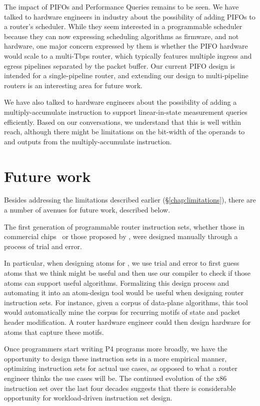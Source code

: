 The impact of PIFOs and Performance Queries remains to be seen. We have talked
to hardware engineers in industry about the possibility of adding PIFOs to a
router's scheduler. While they seem interested in a programmable scheduler
because they can now expressing scheduling algorithms as firmware, and not
hardware, one major concern expressed by them is whether the PIFO hardware
would scale to a multi-Tbps router, which typically features multiple ingress
and egress pipelines separated by the packet buffer. Our current PIFO design is
intended for a single-pipeline router, and extending our design to
multi-pipeline routers is an interesting area for future work.

We have also talked to hardware engineers about the possibility of adding a
multiply-accumulate instruction to support linear-in-state measurement queries
efficiently. Based on our conversations, we understand that this is well within
reach, although there might be limitations on the bit-width of the operands to and
outputs from the multiply-accumulate instruction.

\section{Future work}
\label{s:future}

Besides addressing the limitations described earlier (\S\ref{chap:limitations}),
there are a number of avenues for future work, described below.

 The first generation of programmable
router instruction sets, whether those in commercial chips~\cite{xpliant,
flexpipe, tofino, rmt} or those proposed by \pktlanguage, were designed
manually through a process of trial and error.

In particular, when designing atoms for \pktlanguage, we use trial and error to
first guess atoms that we think might be useful and then use our compiler to
check if those atoms can support useful algorithms.  Formalizing this design
process and automating it into an atom-design tool would be useful when
designing router instruction sets. For instance, given a corpus of data-plane
algorithms, this tool would automatically mine the corpus for recurring motifs
of state and packet header modification. A router hardware engineer could then
design hardware for atoms that capture these motifs.

 Once programmers start writing P4 programs more broadly, we have the
opportunity to design these instruction sets in a more empirical manner,
optimizing instruction sets for actual use cases, as opposed to what a router
engineer thinks the use cases will be. The continued evolution of the x86
instruction set over the last four decades suggests that there is considerable
opportunity for workload-driven instruction set design.

